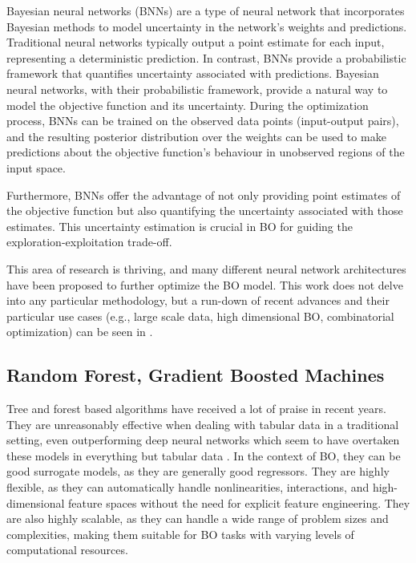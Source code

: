 Bayesian neural networks (BNNs) are a type of neural network that incorporates Bayesian methods to model uncertainty in the network's weights and predictions. Traditional neural networks typically output a point estimate for each input, representing a deterministic prediction. In contrast, BNNs provide a probabilistic framework that quantifies uncertainty associated with predictions. Bayesian neural networks, with their probabilistic framework, provide a natural way to model the objective function and its uncertainty. During the optimization process, BNNs can be trained on the observed data points (input-output pairs), and the resulting posterior distribution over the weights can be used to make predictions about the objective function's behaviour in unobserved regions of the input space. 

Furthermore, BNNs offer the advantage of not only providing point estimates of the objective function but also quantifying the uncertainty associated with those estimates. This uncertainty estimation is crucial in BO for guiding the exploration-exploitation trade-off. 

This area of research is thriving, and many different neural network architectures have been proposed to further optimize the BO model. This work does not delve into any particular methodology, but a run-down of recent advances and their particular use cases (e.g., large scale data, high dimensional BO, combinatorial optimization) can be seen in \cite{wang2023recent}.

\subsection{Random Forest, Gradient Boosted Machines}

Tree and forest based algorithms have received a lot of praise in recent years. They are unreasonably effective when dealing with tabular data in a traditional setting, even outperforming deep neural networks which seem to have overtaken these models in everything but tabular data \cite{grinsztajn2022tree}. In the context of BO, they can be good surrogate models, as they are generally good regressors. They are highly flexible, as they can automatically handle nonlinearities, interactions, and high-dimensional feature spaces without the need for explicit feature engineering. They are also highly scalable, as they can handle a wide range of problem sizes and complexities, making them suitable for BO tasks with varying levels of computational resources.


